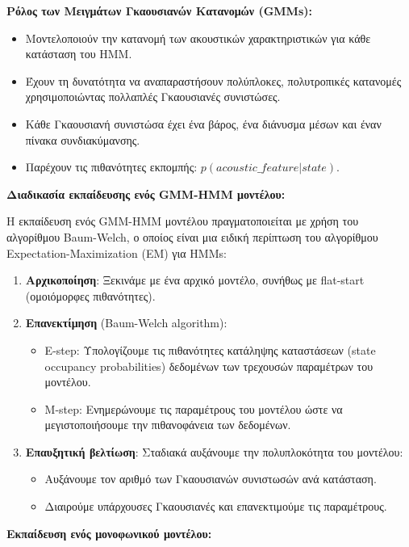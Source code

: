 \documentclass[a4paper,12pt]{article}
\begin{document}
\textbf{Ρόλος των Μειγμάτων Γκαουσιανών Κατανομών (GMMs):}
\begin{itemize}
    \item Μοντελοποιούν την κατανομή των ακουστικών χαρακτηριστικών για κάθε κατάσταση του HMM.
    \item Έχουν τη δυνατότητα να αναπαραστήσουν πολύπλοκες, πολυτροπικές κατανομές χρησιμοποιώντας πολλαπλές Γκαουσιανές συνιστώσες.
    \item Κάθε Γκαουσιανή συνιστώσα έχει ένα βάρος, ένα διάνυσμα μέσων και έναν πίνακα συνδιακύμανσης.
    \item Παρέχουν τις πιθανότητες εκπομπής: $p(acoustic\_feature | state)$.
\end{itemize}

\textbf{Διαδικασία εκπαίδευσης ενός GMM-HMM μοντέλου:}

Η εκπαίδευση ενός GMM-HMM μοντέλου πραγματοποιείται με χρήση του αλγορίθμου Baum-Welch, ο οποίος είναι μια ειδική περίπτωση του αλγορίθμου Expectation-Maximization (EM) για HMMs:

\begin{enumerate}
    \item \textbf{Αρχικοποίηση}: Ξεκινάμε με ένα αρχικό μοντέλο, συνήθως με flat-start (ομοιόμορφες πιθανότητες).
    
    \item \textbf{Επανεκτίμηση} (Baum-Welch algorithm):
    \begin{itemize}
        \item E-step: Υπολογίζουμε τις πιθανότητες κατάληψης καταστάσεων (state occupancy probabilities) δεδομένων των τρεχουσών παραμέτρων του μοντέλου.
        \item M-step: Ενημερώνουμε τις παραμέτρους του μοντέλου ώστε να μεγιστοποιήσουμε την πιθανοφάνεια των δεδομένων.
    \end{itemize}
    
    \item \textbf{Επαυξητική βελτίωση}: Σταδιακά αυξάνουμε την πολυπλοκότητα του μοντέλου:
    \begin{itemize}
        \item Αυξάνουμε τον αριθμό των Γκαουσιανών συνιστωσών ανά κατάσταση.
        \item Διαιρούμε υπάρχουσες Γκαουσιανές και επανεκτιμούμε τις παραμέτρους.
    \end{itemize}
\end{enumerate}

\textbf{Εκπαίδευση ενός μονοφωνικού μοντέλου:}
\end{document}
